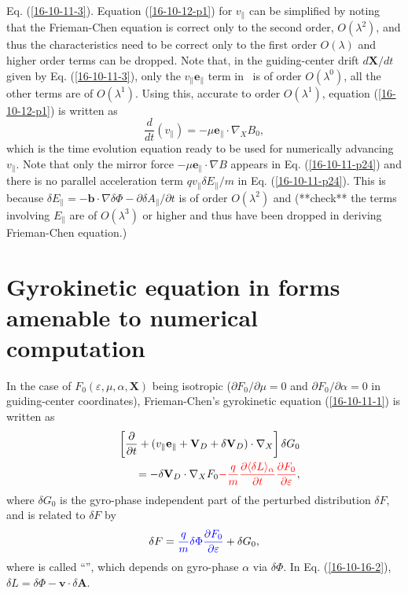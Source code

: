 \documentclass{llncs}
\newcommand{\tmcolor}[2]{{\color{#1}{#2}}}
\begin{document}
Eq. (\ref{16-10-11-3}). Equation (\ref{16-10-12-p1}) for $v_{\parallel}$ can
be simplified by noting that the Frieman-Chen equation is correct only to the
second order, $O (\lambda^2)$, and thus the characteristics need to be correct
only to the first order $O (\lambda)$ and higher order terms can be dropped.
Note that, in the guiding-center drift $d\mathbf{X}/ d t$ given by Eq.
(\ref{16-10-11-3}), only the $v_{\parallel} \mathbf{e}_{\parallel}$ term in \
is of order $O (\lambda^0)$, all the other terms are of $O (\lambda^1)$. Using
this, accurate to order $O (\lambda^1)$, equation (\ref{16-10-12-p1}) is
written as
\begin{equation}
  \label{16-10-11-p24} \frac{d}{d t} (v_{\parallel}) = - \mu
  \mathbf{e}_{\parallel} \cdot \nabla_X B_0,
\end{equation}
which is the time evolution equation ready to be used for numerically
advancing $v_{\parallel}$. Note that only the mirror force $- \mu
\mathbf{e}_{\parallel} \cdot \nabla B$ appears in Eq. (\ref{16-10-11-p24}) and
there is no parallel acceleration term $q v_{\parallel} \delta E_{\parallel} /
m$ in Eq. (\ref{16-10-11-p24}). This is because $\delta E_{\parallel} =
-\mathbf{b} \cdot \nabla \delta \Phi - \partial \delta A_{\parallel} /
\partial t$ is of order $O (\lambda^2)$ and (**check** the terms involving
$E_{\parallel}$ are of $O (\lambda^3)$ or higher and thus have been dropped in
deriving Frieman-Chen equation.)

\section{Gyrokinetic equation in forms amenable to numerical computation}

In the case of $F_0 (\varepsilon, \mu, \alpha, \mathbf{X})$ being isotropic
($\partial F_0 / \partial \mu = 0$ and $\partial F_0 / \partial \alpha = 0$ in
guiding-center coordinates), Frieman-Chen's gyrokinetic equation
(\ref{16-10-11-1}) is written as
\begin{eqnarray}
  &  & \left[ \frac{\partial}{\partial t} + (v_{\parallel}
  \mathbf{e}_{\parallel} +\mathbf{V}_D + \delta \mathbf{V}_D) \cdot \nabla_X
  \right] \delta G_0 \nonumber\\
  &  & = - \delta \mathbf{V}_D \cdot \nabla_X F_0 \tmcolor{red}{- \frac{q}{m}
  \frac{\partial \langle \delta L \rangle_{\alpha}}{\partial t}
  \frac{\partial F_0}{\partial \varepsilon}},  \label{16-10-16-2}
\end{eqnarray}
where $\delta G_0$ is the gyro-phase independent part of the perturbed
distribution $\delta F$, and is related to $\delta F$ by
\begin{equation}
  \delta F = \tmcolor{blue}{\frac{q}{m} \delta \Phi \frac{\partial
  F_0}{\partial \varepsilon}} + \delta G_0,
\end{equation}
where \tmcolor{blue}{the first term} is called ``\tmcolor{blue}{the adiabatic
term}'', which depends on gyro-phase $\alpha$ via $\delta \Phi$. In Eq.
(\ref{16-10-16-2}), $\delta L = \delta \Phi -\mathbf{v} \cdot \delta
\mathbf{A}$.
\end{document}
